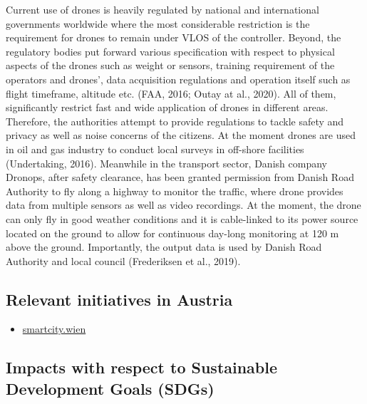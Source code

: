 \documentclass[
]{book}
\providecommand{\tightlist}{%
  \setlength{\itemsep}{0pt}\setlength{\parskip}{0pt}}
\begin{document}
Current use of drones is heavily regulated by national and international governments worldwide where the most considerable restriction is the requirement for drones to remain under VLOS of the controller. Beyond, the regulatory bodies put forward various specification with respect to physical aspects of the drones such as weight or sensors, training requirement of the operators and drones', data acquisition regulations and operation itself such as flight timeframe, altitude etc. (FAA, 2016; Outay at al., 2020). All of them, significantly restrict fast and wide application of drones in different areas. Therefore, the authorities attempt to provide regulations to tackle safety and privacy as well as noise concerns of the citizens. At the moment drones are used in oil and gas industry to conduct local surveys in off-shore facilities (Undertaking, 2016). Meanwhile in the transport sector, Danish company Dronops, after safety clearance, has been granted permission from Danish Road Authority to fly along a highway to monitor the traffic, where drone provides data from multiple sensors as well as video recordings. At the moment, the drone can only fly in good weather conditions and it is cable-linked to its power source located on the ground to allow for continuous day-long monitoring at 120 m above the ground. Importantly, the output data is used by Danish Road Authority and local council (Frederiksen et al., 2019).

\hypertarget{relevant-initiatives-in-austria-3}{%
\subsection*{Relevant initiatives in Austria}\label{relevant-initiatives-in-austria-3}}

\begin{itemize}
\tightlist
\item
  \href{https://smartcity.wien.gv.at/site/en/smart-inspection/}{smartcity.wien}
\end{itemize}

\hypertarget{impacts-with-respect-to-sustainable-development-goals-sdgs-3}{%
\subsection*{Impacts with respect to Sustainable Development Goals (SDGs)}\label{impacts-with-respect-to-sustainable-development-goals-sdgs-3}}
\end{document}
